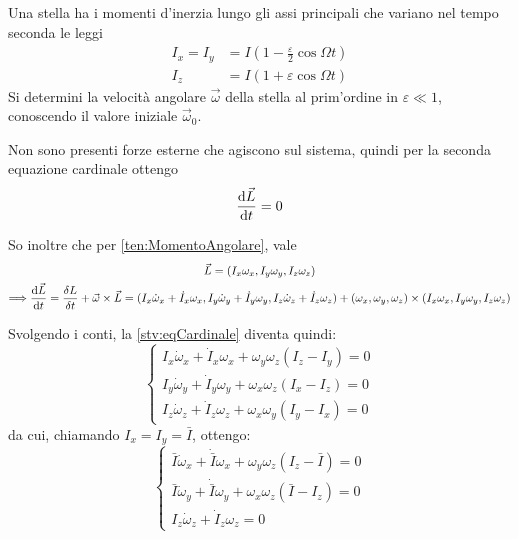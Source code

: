 \documentclass[../main.tex]{subfiles}
\begin{document}
\textex
Una stella ha i momenti d'inerzia lungo gli assi principali che variano nel tempo seconda le leggi
\begin{align*}
	I_x=I_y & =I\left(1-\frac \varepsilon 2\cos\Omega t\right)\\
	I_z & = I\left(1+\varepsilon \cos\Omega t\right)
\end{align*}
Si determini la velocità angolare $\vec\omega$ della stella al prim'ordine in $\varepsilon\ll 1$, conoscendo il valore iniziale $\vec\omega_0$.

\solution
Non sono presenti forze esterne che agiscono sul sistema, quindi per la seconda equazione cardinale ottengo
\begin{equation}\label{stv:eqCardinale}
	\frac{\mathrm{d} \vec L}{\mathrm{d} t}=0
\end{equation}

So inoltre che per \cref{ten:MomentoAngolare}, vale
\begin{gather*}
	\vec L = (I_x\omega_x,I_y\omega_y,I_z\omega_z)\\
	\Longrightarrow \frac{\mathrm{d} \vec L}{\mathrm{d} t}=\frac{\delta L}{\delta t}+\vec\omega\times \vec L = (I_x\dot\omega_x+\dot I_x\omega_x,I_y\dot \omega_y+\dot I_y\omega_y,I_z\dot\omega_z+\dot I_z\omega_z)+(\omega_x,\omega_y,\omega_z)\times (I_x\omega_x,I_y\omega_y,I_z\omega_z)
\end{gather*}

Svolgendo i conti, la \cref{stv:eqCardinale} diventa quindi:
\begin{equation*}
\begin{cases}
	I_x\dot\omega_x+\dot I_x\omega_x+\omega_y\omega_z(I_z-I_y)=0\\
	I_y\dot\omega_y+\dot I_y\omega_y+\omega_x\omega_z(I_x-I_z)=0\\
	I_z\dot\omega_z+\dot I_z\omega_z+\omega_x\omega_y(I_y-I_x)=0
\end{cases}
\end{equation*}
da cui, chiamando $I_x=I_y=\bar I$, ottengo:
\begin{equation*}
\begin{cases}
	\bar I\dot\omega_x+\dot {\bar I}\omega_x+\omega_y\omega_z(I_z-\bar I)=0\\
	\bar I\dot\omega_y+\dot {\bar I} \omega_y+\omega_x\omega_z(\bar I-I_z)=0\\
	I_z\dot\omega_z+\dot I_z\omega_z=0
\end{cases}
\end{equation*}
\end{document}
